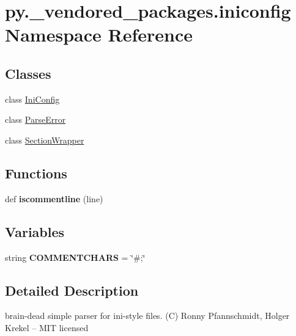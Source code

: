 \hypertarget{namespacepy_1_1__vendored__packages_1_1iniconfig}{}\section{py.\+\_\+vendored\+\_\+packages.\+iniconfig Namespace Reference}
\label{namespacepy_1_1__vendored__packages_1_1iniconfig}
\subsection*{Classes}
\begin{DoxyCompactItemize}
\item 
class \hyperlink{classpy_1_1__vendored__packages_1_1iniconfig_1_1_ini_config}{Ini\+Config}
\item 
class \hyperlink{classpy_1_1__vendored__packages_1_1iniconfig_1_1_parse_error}{Parse\+Error}
\item 
class \hyperlink{classpy_1_1__vendored__packages_1_1iniconfig_1_1_section_wrapper}{Section\+Wrapper}
\end{DoxyCompactItemize}
\subsection*{Functions}
\begin{DoxyCompactItemize}
\item 
\mbox{\label{namespacepy_1_1__vendored__packages_1_1iniconfig_acf4c658fa282e90f25b42f317632439c}} 
def {\bfseries iscommentline} (line)
\end{DoxyCompactItemize}
\subsection*{Variables}
\begin{DoxyCompactItemize}
\item 
\mbox{\label{namespacepy_1_1__vendored__packages_1_1iniconfig_aa13774b08f29cea2ab759ef9e71ff281}} 
string {\bfseries C\+O\+M\+M\+E\+N\+T\+C\+H\+A\+RS} = \char`\"{}\#;\char`\"{}
\end{DoxyCompactItemize}


\subsection{Detailed Description}
\begin{DoxyVerb}brain-dead simple parser for ini-style files.
(C) Ronny Pfannschmidt, Holger Krekel -- MIT licensed
\end{DoxyVerb}
 